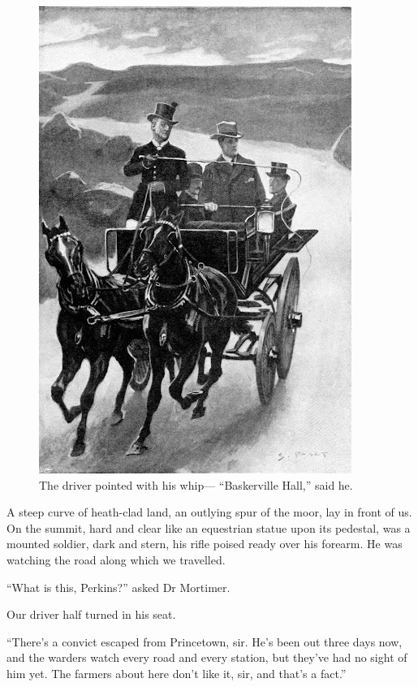 \documentclass[paper=5.5in:8.5in,BCOR=7mm,twoside,DIV=calc,12pt,usegeometry,openany,chapterprefix,endperiod]{scrbook} %
\begin{document}
\begin{figure}[tbhp]
\centering
\includegraphics[width=\textwidth]{06_driverwhip}
\caption{The driver pointed with his whip\nobreakdash--- \enquote{Baskerville Hall,} said he.}
\end{figure}

A steep curve of heath-clad land, an outlying spur of the moor, lay in front of us. On the summit, hard and clear like an equestrian statue upon its pedestal, was a mounted soldier, dark and stern, his rifle poised ready over his forearm. He was watching the road along which we travelled.

\enquote{What is this, Perkins?} asked Dr Mortimer.

Our driver half turned in his seat.

\enquote{There's a convict escaped from Princetown, sir. He's been out three days now, and the warders watch every road and every station, but they've had no sight of him yet. The farmers about here don't like it, sir, and that's a fact.}
\end{document}
